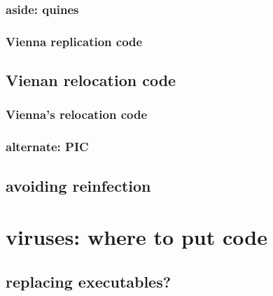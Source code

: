 \subsubsection{aside: quines}



\subsubsection{Vienna replication code}



\subsection{Vienan relocation code}

\subsubsection{Vienna's relocation code}


\subsubsection{alternate: PIC}


\subsection{avoiding reinfection}



\section{viruses: where to put code}



\subsection{replacing executables?}


